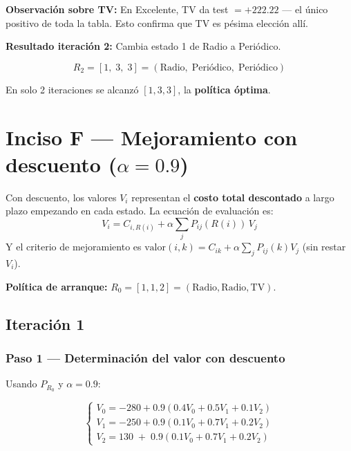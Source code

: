 \documentclass[12pt,a4paper]{article}
\begin{document}
\textbf{Observación sobre TV:} En Excelente, TV da test $=+222.22$ --- el único positivo de toda la tabla. Esto confirma que TV es pésima elección allí.

\vspace{0.3cm}
\textbf{Resultado iteración 2:} Cambia estado 1 de Radio a Periódico.

\[
\boxed{ R_2 = [1,\; 3,\; 3] = (\text{Radio},\; \text{Periódico},\; \text{Periódico}) }
\]

En solo 2 iteraciones se alcanzó $[1,3,3]$, la \textbf{política óptima}.

\newpage

\section{Inciso F --- Mejoramiento con descuento ($\alpha = 0.9$)}

Con descuento, los valores $V_i$ representan el \textbf{costo total descontado} a largo plazo empezando en cada estado. La ecuación de evaluación es:
\[ V_i = C_{i,R(i)} + \alpha \sum_{j} P_{ij}(R(i))\, V_j \]
Y el criterio de mejoramiento es $\text{valor}(i,k) = C_{ik} + \alpha\sum_{j}P_{ij}(k)V_j$ (sin restar $V_i$).

\vspace{0.2cm}
\textbf{Política de arranque:} $R_0 = [1, 1, 2] = (\text{Radio}, \text{Radio}, \text{TV})$.

\subsection*{Iteración 1}

\subsubsection*{Paso 1 --- Determinación del valor con descuento}

Usando $P_{R_0}$ y $\alpha = 0.9$:

\[
\begin{cases}
V_0 = -280 + 0.9(0.4V_0 + 0.5V_1 + 0.1V_2) \\
V_1 = -250 + 0.9(0.1V_0 + 0.7V_1 + 0.2V_2) \\
V_2 = 130 \;+\; 0.9(0.1V_0 + 0.7V_1 + 0.2V_2)
\end{cases}
\]
\end{document}
